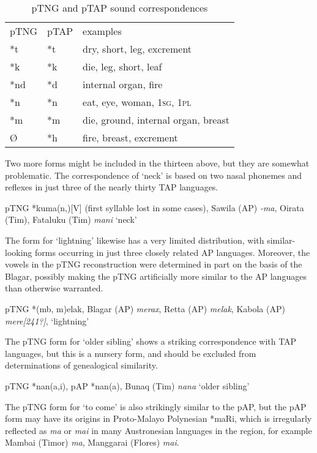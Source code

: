 \begin{table}\centering


\begin{tabular}{lll}
pTNG&pTAP&examples\\
*t&*t&dry, short, leg, excrement\\
*k&*k&die, leg, short, leaf\\
*nd&*d&internal organ, fire\\
*n&*n&eat, eye, woman, \textsc{1sg, 1pl}\\
*m&*m&die, ground, internal organ, breast\\
{\O}&*h&fire, breast, excrement\\

\end{tabular}

\caption{pTNG and pTAP sound correspondences}\end{table}
Two more forms might be included in the thirteen above, but they are somewhat problematic. The correspondence of `neck' is based on two nasal phonemes and reflexes in just three of the nearly thirty TAP languages.

\ea%
   pTNG *kuma(n,{\ng})[V] (first syllable lost in some cases), Sawila (AP) \textit{-ma{\ng}}, Oirata (Tim), Fataluku (Tim) \textit{mani} `neck'
\z

The form for `lightning' likewise has a very limited distribution, with similar-looking forms occurring in just three closely related AP languages. Moreover, the vowels in the pTNG reconstruction were determined in part on the basis of the Blagar, possibly making the pTNG artificially more similar to the AP languages than otherwise warranted.

\ea%
   pTNG *(mb, m)elak, Blagar (AP) \textit{merax}, Retta (AP) \textit{melak}, Kabola (AP) \textit{mere}\textit{[241?]}, `lightning'
\z

The pTNG form for `older sibling' shows a striking correspondence with TAP languages, but this is a nursery form, and should be excluded from determinations of genealogical similarity.

\ea%
   pTNG *nan(a,i), pAP *nan(a), Bunaq (Tim) \textit{nana} `older sibling'
\z

The pTNG form for `to come' is also strikingly similar to the pAP, but the pAP form may have its origins in Proto-Malayo Polynesian *maRi, which is irregularly reflected as \textit{ma }or \textit{mai }in many Austronesian languages in the region, for example Mambai (Timor) \textit{ma}, Manggarai (Flores) \textit{mai}.


